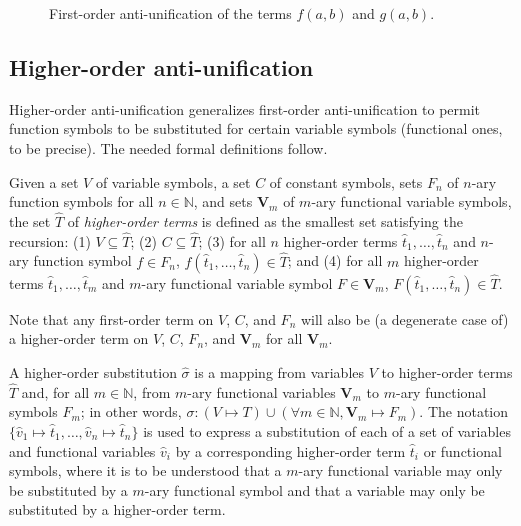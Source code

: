 \begin{figure}[t]
\centering{}
\caption{First-order anti-unification of the terms $f(a,b)$ and $g(a,b)$.\label{fig:first-anti-uni}}
\end{figure}

\subsection{Higher-order anti-unification}

Higher-order anti-unification generalizes first-order anti-unification to permit function symbols to be substituted for certain variable symbols (functional ones, to be precise).  The needed formal definitions follow.

\begin{defn}\label{def:hterm}
Given a set $V$ of variable symbols, a set $C$ of constant symbols, sets $F_n$ of $n$-ary function symbols for all $n\in\mathbb{N}$, and sets $\mathbf{V}_m$ of $m$-ary functional variable symbols, the set $\hat{T}$ of \emph{higher-order terms} is defined as the smallest set satisfying the recursion: (1) $V\subseteq \hat{T}$; (2) $C\subseteq \hat{T}$; (3) for all $n$ higher-order terms $\hat{t}_1, \ldots, \hat{t}_n$ and $n$-ary function symbol $f\in F_n$,  $f(\hat{t}_1, \ldots, \hat{t}_n) \in \hat{T}$; and (4) for all $m$ higher-order terms $\hat{t}_1, \ldots, \hat{t}_m$ and $m$-ary functional variable symbol $F\in \mathbf{V}_m$,  $F(\hat{t}_1, \ldots, \hat{t}_n) \in \hat{T}$.
\end{defn}

Note that any first-order term on $V$, $C$, and $F_n$ will also be (a degenerate case of) a higher-order term on $V$, $C$, $F_n$, and $\mathbf{V}_m$ for all $\mathbf{V}_m$.

\begin{defn}\label{def:HOsubstitution}
A higher-order substitution $\hat{\sigma}$ is a mapping from variables $V$ to higher-order terms $\hat{T}$ and, for all $m\in\mathbb{N}$, from $m$-ary functional variables $\mathbf{V}_m$ to $m$-ary functional symbols $F_m$; in other words, $\sigma: (V\mapsto T)\cup(\forall m\in \mathbb{N}, \mathbf{V}_m\mapsto F_m)$. The notation $\{\hat{v}_1 \mapsto \hat{t}_1, \ldots, \hat{v}_n \mapsto \hat{t}_n\}$ is used to express a substitution of each of a set of variables and functional variables $\hat{v}_i$ by a corresponding higher-order term $\hat{t}_i$ or functional symbols, where it is to be understood that a $m$-ary functional variable may only be substituted by a $m$-ary functional symbol and that a variable may only be substituted by a higher-order term.
\end{defn}

